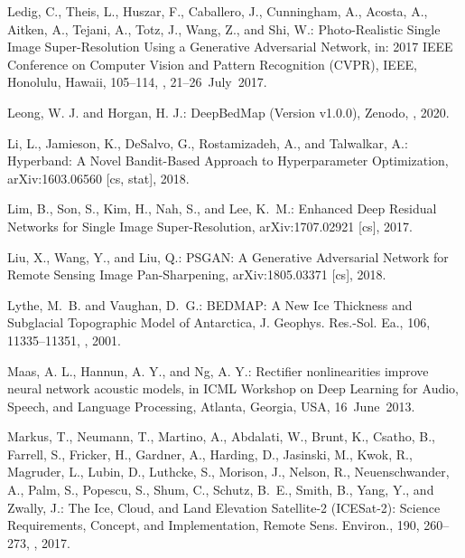 \documentclass[tc, noline]{copernicus}
\begin{document}
\begin{thebibliography}{95}
Ledig, C., Theis, L., Huszar, F., Caballero, J., Cunningham, A., Acosta, A., Aitken, A., Tejani, A., Totz, J., Wang, Z., and Shi, W.: Photo-Realistic Single Image Super-Resolution Using a Generative Adversarial Network, in: 2017 IEEE Conference on Computer Vision and Pattern Recognition (CVPR), IEEE, Honolulu, Hawaii, 105--114, , 21--26~July~2017.

Leong, W. J. and Horgan, H. J.: DeepBedMap (Version v1.0.0), Zenodo, , 2020.

Li, L., Jamieson, K., DeSalvo, G., Rostamizadeh, A., and Talwalkar, A.:
Hyperband: A Novel Bandit-Based Approach to Hyperparameter Optimization,
arXiv:1603.06560 [cs, stat], 2018.

Lim, B., Son, S., Kim, H., Nah, S., and Lee, K.~M.:
Enhanced Deep Residual Networks for Single Image Super-Resolution,
arXiv:1707.02921 [cs], 2017.

Liu, X., Wang, Y., and Liu, Q.:
PSGAN: A Generative Adversarial Network for Remote Sensing Image Pan-Sharpening,
arXiv:1805.03371 [cs], 2018.

Lythe, M.~B. and Vaughan, D.~G.: BEDMAP:
A New Ice Thickness and Subglacial Topographic Model of Antarctica,
J. Geophys. Res.-Sol. Ea.,
106, 11335--11351, , 2001.


Maas, A. L., Hannun, A. Y., and Ng, A. Y.: Rectifier nonlinearities improve neural network acoustic models, in ICML Workshop on Deep Learning for Audio, Speech, and Language Processing, Atlanta, Georgia, USA, 16~June~2013.

Markus, T., Neumann, T., Martino, A., Abdalati, W., Brunt, K., Csatho, B., Farrell, S., Fricker, H., Gardner, A., Harding, D., Jasinski, M., Kwok, R., Magruder, L., Lubin, D., Luthcke, S., Morison, J., Nelson, R., Neuenschwander, A., Palm, S., Popescu, S., Shum, C., Schutz, B.~E., Smith, B., Yang, Y., and Zwally, J.:
The Ice, Cloud, and Land Elevation Satellite-2 (ICESat-2): Science Requirements, Concept, and Implementation,
Remote Sens. Environ.,
190, 260--273, , 2017.


\end{thebibliography}
\end{document}

